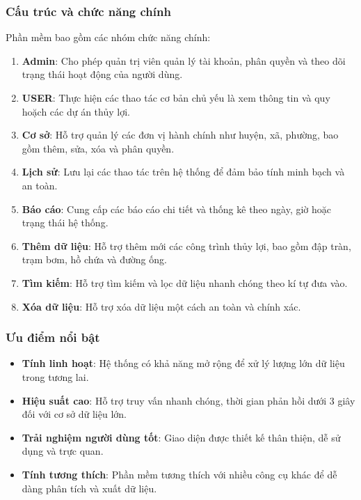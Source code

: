 \documentclass{article} %
\begin{document}
\subsubsection{Cấu trúc và chức năng chính}
Phần mềm bao gồm các nhóm chức năng chính:
\begin{enumerate}
    \item \textbf{Admin}: Cho phép quản trị viên quản lý tài khoản, phân quyền và theo dõi trạng thái hoạt động của người dùng.
    \item \textbf{USER}: Thực hiện các thao tác cơ bản chủ yếu là xem thông tin và quy hoặch các dự án thủy lợi.
    \item \textbf{Cơ sở}: Hỗ trợ quản lý các đơn vị hành chính như huyện, xã, phường, bao gồm thêm, sửa, xóa và phân quyền.
    \item \textbf{Lịch sử}: Lưu lại các thao tác trên hệ thống để đảm bảo tính minh bạch và an toàn.
    \item \textbf{Báo cáo}: Cung cấp các báo cáo chi tiết và thống kê theo ngày, giờ hoặc trạng thái hệ thống.
    \item \textbf{Thêm dữ liệu}: Hỗ trợ thêm mới các công trình thủy lợi, bao gồm đập tràn, trạm bơm, hồ chứa và đường ống.
    \item \textbf{Tìm kiếm}: Hỗ trợ tìm kiếm và lọc dữ liệu nhanh chóng theo kí tự đưa vào.
    \item \textbf{Xóa dữ liệu}: Hỗ trợ xóa dữ liệu một cách an toàn và chính xác.

\end{enumerate}

\subsubsection{Ưu điểm nổi bật}
\begin{itemize}
    \item \textbf{Tính linh hoạt}: Hệ thống có khả năng mở rộng để xử lý lượng lớn dữ liệu trong tương lai.
    \item \textbf{Hiệu suất cao}: Hỗ trợ truy vấn nhanh chóng, thời gian phản hồi dưới 3 giây đối với cơ sở dữ liệu lớn.
    \item \textbf{Trải nghiệm người dùng tốt}: Giao diện được thiết kế thân thiện, dễ sử dụng và trực quan.
    \item \textbf{Tính tương thích}: Phần mềm tương thích với nhiều công cụ khác để dễ dàng phân tích và xuất dữ liệu.
\end{itemize}
\end{document}
